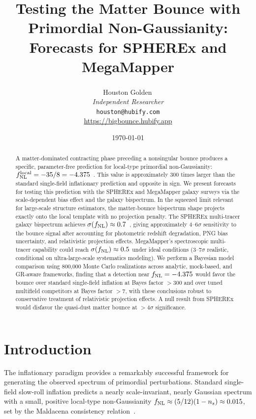 \documentclass[a4paper,11pt]{article}
\title{Testing the Matter Bounce with Primordial Non-Gaussianity:\\Forecasts for SPHEREx and MegaMapper}
\author{Houston Golden\,\textsuperscript{\orcidicon}\\[4pt]
{\small\textit{Independent Researcher}}\\[2pt]
{\small\texttt{houston@hubify.com}}\\[2pt]
{\small\url{https://bigbounce.hubify.app}}}
\date{\today}
\newcommand{\fnl}{f_{\rm NL}}
\begin{document}
\sloppy
\maketitle

\begin{abstract}
A matter-dominated contracting phase preceding a nonsingular bounce produces a specific, parameter-free prediction for local-type primordial non-Gaussianity: $\fnl^{\rm local} = -35/8 = -4.375$~\citep{Cai:2009fn}. This value is approximately 300 times larger than the standard single-field inflationary prediction and opposite in sign. We present forecasts for testing this prediction with the SPHEREx and MegaMapper galaxy surveys via the scale-dependent bias effect and the galaxy bispectrum. In the squeezed limit relevant for large-scale structure estimators, the matter-bounce bispectrum shape projects exactly onto the local template with no projection penalty. The SPHEREx multi-tracer galaxy bispectrum achieves $\sigma(\fnl) \approx 0.7$~\citep{Heinrich:2023}, giving approximately $4$--$6\sigma$ sensitivity to the bounce signal after accounting for photometric redshift degradation, PNG bias uncertainty, and relativistic projection effects. MegaMapper's spectroscopic multi-tracer capability could reach $\sigma(\fnl) \approx 0.5$ under ideal conditions ($3$--$7\sigma$ realistic, conditional on ultra-large-scale systematics modeling). We perform a Bayesian model comparison using 800{,}000 Monte Carlo realizations across analytic, mock-based, and GR-aware frameworks, finding that a detection near $\fnl = -4.375$ would favor the bounce over standard single-field inflation at Bayes factor $> 300$ and over tuned multifield competitors at Bayes factor $> 7$, with these conclusions robust to conservative treatment of relativistic projection effects. A null result from SPHEREx would disfavor the quasi-dust matter bounce at $> 4\sigma$ significance.
\end{abstract}

\section{Introduction}
\label{sec:intro}

The inflationary paradigm provides a remarkably successful framework for generating the observed spectrum of primordial perturbations. Standard single-field slow-roll inflation predicts a nearly scale-invariant, nearly Gaussian spectrum with a small, positive local-type non-Gaussianity $\fnl \approx (5/12)(1-n_s) \approx 0.015$, set by the Maldacena consistency relation~\citep{Maldacena:2002vr}.
\end{document}
